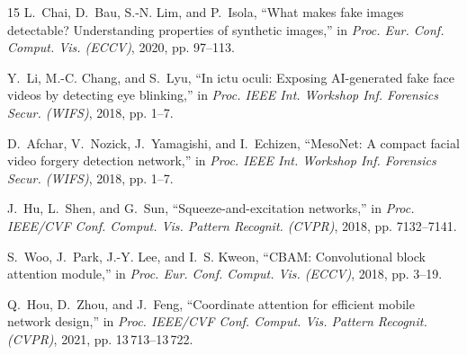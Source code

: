 \documentclass[conference]{IEEEtran}
\begin{document}
\begin{thebibliography}{15}
L.~Chai, D.~Bau, S.-N. Lim, and P.~Isola, ``What makes fake images detectable? Understanding properties of synthetic images,'' in \emph{Proc. Eur. Conf. Comput. Vis. (ECCV)}, 2020, pp. 97--113.

Y.~Li, M.-C. Chang, and S.~Lyu, ``In ictu oculi: Exposing AI-generated fake face videos by detecting eye blinking,'' in \emph{Proc. IEEE Int. Workshop Inf. Forensics Secur. (WIFS)}, 2018, pp. 1--7.

D.~Afchar, V.~Nozick, J.~Yamagishi, and I.~Echizen, ``MesoNet: A compact facial video forgery detection network,'' in \emph{Proc. IEEE Int. Workshop Inf. Forensics Secur. (WIFS)}, 2018, pp. 1--7.

J.~Hu, L.~Shen, and G.~Sun, ``Squeeze-and-excitation networks,'' in \emph{Proc. IEEE/CVF Conf. Comput. Vis. Pattern Recognit. (CVPR)}, 2018, pp. 7132--7141.

S.~Woo, J.~Park, J.-Y. Lee, and I.~S. Kweon, ``CBAM: Convolutional block attention module,'' in \emph{Proc. Eur. Conf. Comput. Vis. (ECCV)}, 2018, pp. 3--19.

Q.~Hou, D.~Zhou, and J.~Feng, ``Coordinate attention for efficient mobile network design,'' in \emph{Proc. IEEE/CVF Conf. Comput. Vis. Pattern Recognit. (CVPR)}, 2021, pp. 13\,713--13\,722.

\end{thebibliography}
\end{document}
